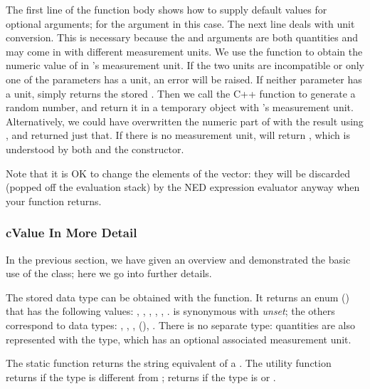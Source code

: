 The first line of the function body shows how to supply default values for
optional arguments; for the  argument in this case. The next line
deals with unit conversion. This is necessary because the  and
 arguments are both quantities and may come in with different
measurement units. We use the  function to
obtain the numeric value of  in 's measurement unit. If the
two units are incompatible or only one of the parameters has a unit, an
error will be raised. If neither parameter has a unit,
 simply returns the stored . Then we
call the  C++ function to generate a random number,
and return it in a temporary object with 's measurement unit.
Alternatively, we could have overwritten the numeric part of  with
the result using , and returned just that. If
there is no measurement unit,  will return ,
which is understood by both  and the
 constructor.

\begin{note}
Note that it is OK to change the elements of the  vector: they
will be discarded (popped off the evaluation stack) by the NED expression
evaluator anyway when your function returns.
\end{note}


\subsubsection{cValue In More Detail}
\label{sec:sim-lib:cvalue-in-more-detail}

In the previous section, we have given an overview and demonstrated the basic
use of the  class; here we go into further details.

The stored data type can be obtained with the  function.
It returns an enum () that has the following values:
, , , , , .
 is synonymous with \textit{unset}; the others correspond to data
types: , , , 
(), .
There is no separate  type: quantities are also represented with
the  type, which has an optional associated measurement unit.

The  static function returns the string equivalent of
a . The utility function  returns 
if the type is different from ;  returns 
if the type is  or .


